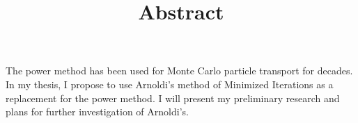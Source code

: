 \documentclass[12pt]{article}
\title{Abstract}
\date{}
\begin{document}
\maketitle

The power method has been used for Monte Carlo particle transport for decades.  In my thesis, I propose to use Arnoldi's method of Minimized Iterations as a replacement for the power method.  I will present my preliminary research and plans for further investigation of Arnoldi's.
\end{document}

